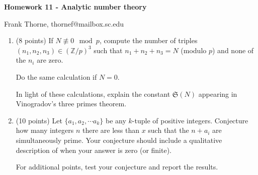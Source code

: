 \documentclass[12pt]{article}
\begin{document}
\setlength{\topmargin}{-2mm}





\begin{center}{\bf Homework 11 - Analytic number theory}
\end{center}
\begin{center}Frank Thorne, thornef@mailbox.sc.edu
\end{center}
\begin{enumerate}
\item (8 points)
If $N \not \equiv 0 \mod p$, compute the number of triples $(n_1, n_2, n_3) \in (\mathbb{Z}/p)^3$
such that $n_1 + n_2 + n_3 = N$ (modulo $p$) and none of the $n_i$ are zero.

Do the same calculation if $N = 0$.

In light of these calculations, explain the constant $\mathfrak{S}(N)$ appearing
in Vinogradov's three primes theorem.

\item (10 points)
Let $\{a_1, a_2, \cdots a_k\}$ be any $k$-tuple of positive integers. Conjecture
how many integers $n$ there are less than $x$ such that the $n + a_i$ are simultaneously
prime. Your conjecture should include a qualitative description of when your answer
is zero (or finite). 

For additional points, test your conjecture and report the results.

\end{enumerate}
\end{document}
